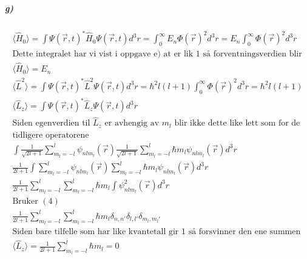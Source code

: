 \documentclass[11pt, A4paper,norsk]{article}
\begin{document}
			\subparagraph{g)}
				\begin{gather*}
\langle \hat{H}_0 \rangle = \int \Psi(\vec{r}, t)^{*} \hat{H}_0 \Psi(\vec{r}, t) d^3r = \int_{0}^{\infty} E_n \Phi(\vec{r})^2 d^3r = E_n \int_{0}^{\infty} \Phi(\vec{r})^2 d^3r \\
\text{Dette integralet har vi vist i oppgave e) at er lik $1$ så forventningsverdien blir} \\
\langle \hat{H}_0 \rangle = E_n \\
\langle \hat{L}^2 \rangle = \int \Psi(\vec{r}, t)^{*} \hat{L}^2 \Psi(\vec{r}, t) d^3r = \hbar^2 l(l + 1) \int_{0}^{\infty} \Phi(\vec{r})^2 d^3r = \hbar^2 l(l + 1) \\
\langle \hat{L}_z \rangle = \int \Psi(\vec{r}, t)^{*} \hat{L}_z \Psi(\vec{r}, t) d^3r \\
\text{Siden egenverdien til $\hat{L}_z$ er avhengig av $m_l$ blir ikke dette like lett som for de} \\
\text{tidligere operatorene} \\
\int \frac{1}{\sqrt{2l + 1}} \sum_{m_l = -l}^{l} \psi_{nlm_{l}}(\vec{r}) \frac{1}{\sqrt{2l + 1}} \sum_{m_l = -l}^{l} \hbar m_l \psi_{nlm_{l}}(\vec{r}) d^3r \\
\frac{1}{2l + 1} \int \sum_{m_l = -l}^{l} \psi_{nlm_{l}}(\vec{r}) \sum_{m_l = -l}^{l} \hbar m_l \psi_{nlm_{l}}(\vec{r}) d^3r \\
\frac{1}{2l + 1} \sum_{m_l = -l}^{l} \sum_{m_l = -l}^{l} \hbar m_l \int \psi_{nlm_{l}}^2(\vec{r}) d^3r \\
\text{Bruker $(4)$} \\
\frac{1}{2l + 1} \sum_{m_l = -l}^{l} \sum_{m_l = -l}^{l} \hbar m_l \delta_{n, n'} \delta_{l, l'} \delta_{m_l, m_l'} \\
\text{Siden bare tilfelle som har like kvantetall gir $1$ så forsvinner den ene summen} \\
\langle \hat{L}_z \rangle = \frac{1}{2l + 1} \sum_{m_l = -l}^{l} \hbar m_l = 0
				\end{gather*}
\end{document}
